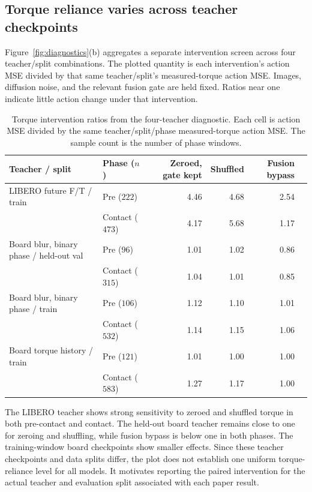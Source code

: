 \documentclass[10pt,twocolumn,letterpaper]{article}
\begin{document}
\subsection{Torque reliance varies across teacher checkpoints}
Figure~\ref{fig:diagnostics}(b) aggregates a separate intervention screen
across four teacher/split combinations. The plotted quantity is each
intervention's action MSE divided by that same teacher/split's measured-torque
action MSE. Images, diffusion noise, and the relevant fusion gate are held
fixed. Ratios near one indicate little action change under that intervention.

\begin{table}[t]
\centering
\caption{Torque intervention ratios from the four-teacher diagnostic. Each
cell is action MSE divided by the same teacher/split/phase measured-torque
action MSE. The sample count is the number of phase windows.}
\label{tab:cross_teacher_torque}
\setlength{\tabcolsep}{5pt}
\begin{tabular}{@{}llrrrr@{}}
\toprule
Teacher / split & Phase ($n$) & Zeroed, gate kept & Shuffled & Fusion bypass \\
\midrule
LIBERO future F/T / train & Pre ($222$) & 4.46 & 4.68 & 2.54 \\
 & Contact ($473$) & 4.17 & 5.68 & 1.17 \\
Board blur, binary phase / held-out val & Pre ($96$) & 1.01 & 1.02 & 0.86 \\
 & Contact ($315$) & 1.04 & 1.01 & 0.85 \\
Board blur, binary phase / train & Pre ($106$) & 1.12 & 1.10 & 1.01 \\
 & Contact ($532$) & 1.14 & 1.15 & 1.06 \\
Board torque history / train & Pre ($121$) & 1.01 & 1.00 & 1.00 \\
 & Contact ($583$) & 1.27 & 1.17 & 1.00 \\
\bottomrule
\end{tabular}
\end{table}

The LIBERO teacher shows strong sensitivity to zeroed and shuffled torque in
both pre-contact and contact. The held-out board teacher remains close to one
for zeroing and shuffling, while fusion bypass is below one in both phases.
The training-window board checkpoints show smaller effects. Since these
teacher checkpoints and data splits differ, the plot does not establish one
uniform torque-reliance level for all models. It motivates reporting the
paired intervention for the actual teacher and evaluation split associated
with each paper result.
\end{document}
